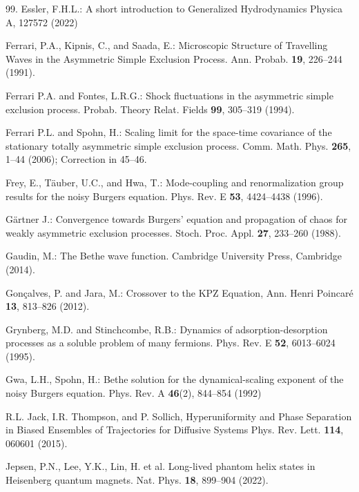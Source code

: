 \documentclass[12pt]{article}
\begin{document}
\begin{thebibliography}{99.}
Essler, F.H.L.:
A short introduction to Generalized Hydrodynamics
Physica A, 127572 (2022)

Ferrari, P.A., Kipnis, C., and Saada, E.:
Microscopic Structure of Travelling Waves in the Asymmetric Simple Exclusion Process.
Ann. Probab. \textbf{19}, 226--244 (1991).

Ferrari P.A. and Fontes, L.R.G.: 
Shock fluctuations in the asymmetric simple exclusion process.
Probab. Theory Relat. Fields \textbf{99}, 305--319 (1994).

Ferrari P.L. and Spohn, H.: 
Scaling limit for the space-time covariance of the stationary totally asymmetric simple exclusion process.
Comm. Math. Phys. \textbf{265}, 1--44 (2006); 
Correction in 45--46.

Frey, E., T\"auber, U.C., and Hwa, T.:
Mode-coupling and renormalization group results for the noisy Burgers equation.
Phys. Rev. E \textbf{53}, 4424--4438 (1996).

G\"artner J.: 
Convergence towards Burgers’ equation and propagation of chaos for weakly asymmetric exclusion processes. 
Stoch. Proc. Appl. \textbf{27}, 233--260 (1988).

Gaudin, M.:
The Bethe wave function.
Cambridge University Press, Cambridge (2014).

Gon\c calves, P. and Jara, M.:
Crossover to the KPZ Equation,
Ann. Henri Poincar\'e \textbf{13}, 813--826 (2012).

Grynberg, M.D. and Stinchcombe, R.B.:
Dynamics of adsorption-desorption processes as a soluble problem of many fermions.
Phys. Rev. E \textbf{52}, 6013--6024 (1995).

Gwa, L.H., Spohn, H.:
Bethe solution for the dynamical-scaling exponent of the noisy Burgers equation.
Phys. Rev. A \textbf{46}(2), 844--854 (1992)

R.L. Jack, I.R. Thompson, and P. Sollich, 
Hyperuniformity and Phase Separation in Biased Ensembles of Trajectories
 for Diffusive Systems
Phys. Rev. Lett. \textbf{114}, 060601 (2015).

Jepsen, P.N., Lee, Y.K., Lin, H. et al. 
Long-lived phantom helix states in Heisenberg quantum magnets. 
Nat. Phys. \textbf{18}, 899--904 (2022). 


\end{thebibliography}
\end{document}
